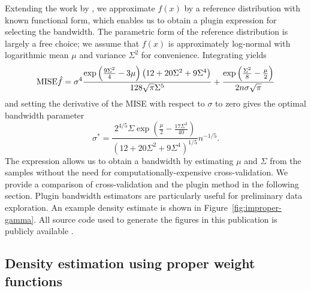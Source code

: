 Extending the work by \citet{Chen2000}, we approximate $f\left(x\right)$ by a reference distribution with known functional form, which enables us to obtain a plugin expression for selecting the bandwidth. The parametric form of the reference distribution is largely a free choice; we assume that $f(x)$ is approximately log-normal with logarithmic mean $\mu$ and variance $\Sigma^{2}$ for convenience. Integrating yields 
\begin{equation}
\mise\hat{f}=\sigma^{4}\frac{\exp\left(\frac{9\Sigma^{2}}{4}-3\mu\right)\left(12+20\Sigma^{2}+9\Sigma^{4}\right)}{128\sqrt{\pi}\Sigma^{5}}+\frac{\exp\left(\frac{\Sigma^{2}}{8}-\frac{\mu}{2}\right)}{2n\sigma\sqrt{\pi}}\label{eq:chen-lognormal-mise}
\end{equation}
and setting the derivative of the MISE with respect to $\sigma$ to zero gives the optimal bandwidth parameter 
\begin{equation}
\sigma^{*}=\frac{2^{4/5}\Sigma\exp\left(\frac{\mu}{2}-\frac{17\Sigma^{2}}{40}\right)}{\left(12+20\Sigma^{2}+9\Sigma^{4}\right)^{1/5}}n^{-1/5}.\label{eq:chen-plugin}
\end{equation}
The expression allows us to obtain a bandwidth by estimating $\mu$ and $\Sigma$ from the samples without the need for computationally-expensive cross-validation. We provide a comparison of cross-validation and the plugin method in the following section. Plugin bandwidth estimators are particularly useful for preliminary data exploration. An example density estimate is shown in Figure~\ref{fig:improper-gamma}. All source code used to generate the figures in this publication is publicly available \citep{SourceCode}.


\subsection{Density estimation using proper weight functions}

